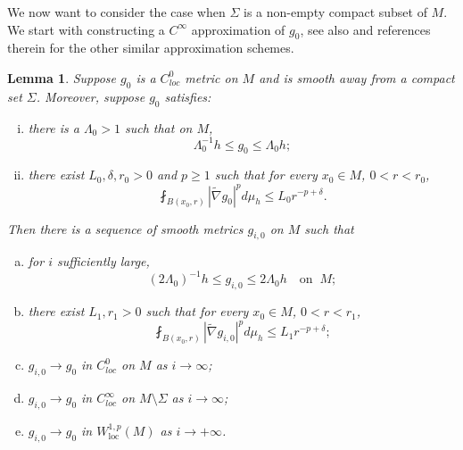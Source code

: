 \documentclass[12pt]{amsart}
\theoremstyle{plain}
\theoremstyle{plain}
\newtheorem{lemma}[subsection]{Lemma}
\theoremstyle{definition}
\theoremstyle{remark}
\numberwithin{equation}{subsection}
\newcommand{\hdel}{\tilde{\nabla}}
\begin{document}
We now want to consider the case when $\Sigma$ is a non-empty compact subset of $M$. We start with constructing a $C^\infty$ approximation of $g_0$, see also \cite{lee_positive_2013,shi_scalar_2016,
lee_continuous_2021,grant_positive_2014} and references therein for the other similar approximation schemes.

\begin{lemma}\label{lem:mollification-scheme}
    Suppose $g_0$ is a $C^0_{loc}$ metric on $M$ and is smooth away from a compact set $\Sigma$. Moreover, suppose $g_0$ satisfies:
    \begin{enumerate}[(i)]
        \item there is a $\Lambda_0 > 1$ such that on $M$,
        \begin{equation*}
            \Lambda_0^{-1}h \leq g_0 \leq \Lambda_0 h;
        \end{equation*}
        \item there exist $L_0,\delta,r_0 > 0$ and $p\geq 1$ such that for every $x_0 \in M$, $0 < r < r_0$,
        \begin{equation*}
            \fint_{B(x_0,r)} |\hdel g_0|^p d\mu_h \leq L_0 r^{-p+\delta}.
        \end{equation*}
    \end{enumerate}
    Then there is a sequence of smooth metrics $g_{i,0}$ on $M$ such that
    \begin{enumerate}[(a)]
        \item for $i$ sufficiently large,
        \begin{equation*}
            (2\Lambda_0)^{-1}h \leq g_{i,0} \leq 2\Lambda_0 h\quad\text{on}\;\;M;
        \end{equation*}
        \item  there exist $L_1,r_1 > 0$  such that for every $x_0 \in M$, $0 < r < r_1$,
        \begin{equation*}
            \fint_{B(x_0,r)} |\hdel g_{i,0}|^p d\mu_h \leq L_1 r^{-p+\delta};
        \end{equation*}
        \item $g_{i,0} \to g_0$ in $C^0_{loc}$ on $M$ as $i \to \infty$;
        \item $g_{i,0} \to g_0$ in $C^\infty_{loc}$ on $M\setminus\Sigma$ as $i \to \infty$;
        \item $g_{i,0} \to g_0$ in $W^{1,p}_\text{loc}(M)$ as $i\to+\infty$.
    \end{enumerate}
\end{lemma}
\end{document}
